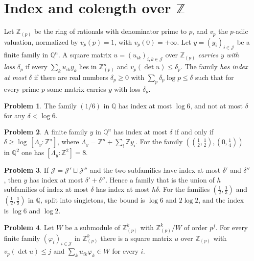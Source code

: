\documentclass[reqno]{amsart}
\theoremstyle{definition}
\newtheorem{problem}{Problem}[section]
\theoremstyle{plain}
\theoremstyle{definition}
\newcommand{\Z}{\mathbb{Z}}
\newcommand{\Q}{\mathbb{Q}}
\newcommand{\Zp}{\Z_{(p)}}
\begin{document}
\section{Index and colength over \texorpdfstring{\(\Z\)}{Z}}\label{sec:index}

Let \(\Zp\) be the ring of rationals with denominator prime to \(p\), and \(v_p\) the \(p\)-adic valuation, normalized by \(v_p(p) = 1\), with \(v_p(0) = +\infty\).  Let \(y = (y_i)_{i \in \mathcal{J}}\) be a finite family in \(\Q^n\).  A square matrix \(u = (u_{ik})_{i,k \in \mathcal{J}}\) over \(\Zp\) \emph{carries \(y\) with loss \(\delta_p\)} if every \(\sum_k u_{ik}y_k\) lies in \(\Zp^n\) and \(v_p(\det u) \le \delta_p\).  The family \emph{has index at most \(\delta\)} if there are real numbers \(\delta_p \ge 0\) with \(\sum_p \delta_p\log p \le \delta\) such that for every prime \(p\) some matrix carries \(y\) with loss \(\delta_p\).

\begin{problem}\label{pr:one-sixth}
The family \((1/6)\) in \(\Q\) has index at most \(\log 6\), and not at most \(\delta\) for any \(\delta < \log 6\).
\end{problem}

\begin{problem}\label{pr:index-lattice}
A finite family \(y\) in \(\Q^n\) has index at most \(\delta\) if and only if \(\delta \ge \log\,[\Lambda_y : \Z^n]\), where \(\Lambda_y = \Z^n + \sum_i \Z y_i\).  For the family \(((\tfrac12, \tfrac12), (0, \tfrac14))\) in \(\Q^2\) one has \([\Lambda_y : \Z^2] = 8\).
\end{problem}

\begin{problem}\label{pr:indices-add}
If \(\mathcal{J} = \mathcal{J}' \sqcup \mathcal{J}''\) and the two subfamilies have index at most \(\delta'\) and \(\delta''\), then \(y\) has index at most \(\delta' + \delta''\).  Hence a family that is the union of \(h\) subfamilies of index at most \(\delta\) has index at most \(h\delta\).  For the families \((\tfrac12, \tfrac13)\) and \((\tfrac12, \tfrac12)\) in \(\Q\), split into singletons, the bound is \(\log 6\) and \(2\log 2\), and the index is \(\log 6\) and \(\log 2\).
\end{problem}

\begin{problem}\label{pr:colength}
Let \(W\) be a submodule of \(\Zp^k\) with \(\Zp^k/W\) of order \(p^j\).  For every finite family \((\varphi_i)_{i \in \mathcal{J}}\) in \(\Zp^k\) there is a square matrix \(u\) over \(\Zp\) with \(v_p(\det u) \le j\) and \(\sum_k u_{ik}\varphi_k \in W\) for every \(i\).
\end{problem}
\end{document}
